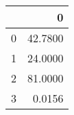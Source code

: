 \begin{tabular}{lr}
\toprule
{} &        0 \\
\midrule
0 &  42.7800 \\
1 &  24.0000 \\
2 &  81.0000 \\
3 &   0.0156 \\
\bottomrule
\end{tabular}
